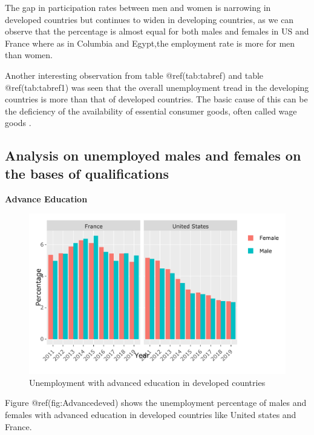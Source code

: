 \documentclass[
]{article}
\begin{document}
The gap in participation rates between men and women is narrowing in
developed countries but continues to widen in developing countries, as
we can observe that the percentage is almost equal for both males and
females in US and France where as in Columbia and Egypt,the employment
rate is more for men than women.\autocite{social}

Another interesting observation from table @ref(tab:tabref) and table
@ref(tab:tabref1) was seen that the overall unemployment tread in the
developing countries is more than that of developed countries. The basic
cause of this can be the deficiency of the availability of essential
consumer goods, often called wage goods \autocite{education}.

\hypertarget{analysis-on-unemployed-males-and-females-on-the-bases-of-qualifications}{%
\subsection{Analysis on unemployed males and females on the bases of
qualifications}\label{analysis-on-unemployed-males-and-females-on-the-bases-of-qualifications}}

\textbf{Advance Education}

\begin{figure}
\centering
\includegraphics{The_Outsiders_5513_files/figure-latex/Advancedeved-1.pdf}
\caption{Unemployment with advanced education in developed countries}
\end{figure}

Figure @ref(fig:Advancedeved) shows the unemployment percentage of males
and females with advanced education in developed countries like United
states and France.
\end{document}

